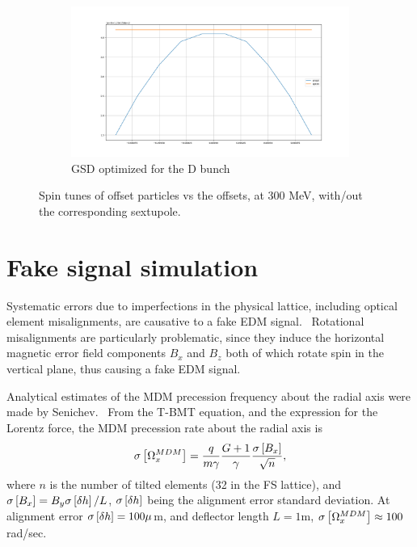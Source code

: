 \documentclass{article}
\begin{document}
\begin{figure}\ContinuedFloat
  \begin{subfigure}[b]{\textwidth}\centering
    \includegraphics[width=\textwidth]{img/SPINTUNE_D_GSD_optim}
    \caption{GSD optimized for the D bunch}
  \end{subfigure}
  \caption{Spin tunes of offset particles vs the offsets, at 300 MeV, with/out the corresponding sextupole.\label{fig:OptSext}}
\end{figure}


\section{Fake signal simulation}

Systematic errors due to imperfections in the physical lattice, including optical element misalignments, are causative to a fake EDM signal.~\citep[p.~230]{Eremey:Thesis} Rotational misalignments are particularly problematic, since they induce the horizontal magnetic error field components $B_x$ and $B_z$ both of which rotate spin in the vertical plane, thus causing a fake EDM signal.

Analytical estimates of the MDM precession frequency about the radial axis were made by Senichev.~\cite{Senichev:MDM} From the T-BMT equation, and the expression for the Lorentz force, the MDM precession rate about the radial axis is
\begin{equation}
  \SD{\W_x^{MDM}} = \frac{q}{m\gamma}\frac{G+1}{\gamma}\frac{\SD{B_x}}{\sqrt{n}},
\end{equation}
where $n$ is the number of tilted elements (32 in the FS lattice), and $\SD{B_x} = B_y \SD{\delta h}/L$, $\SD{\delta h}$  being the alignment error standard deviation. At alignment error $\SD{\delta h} = 100 \mu$m, and deflector length $L=1$m, $\SD{\W_x^{MDM}} \approx 100$ rad/sec.~\cite{Senichev:FDM}
\end{document}
